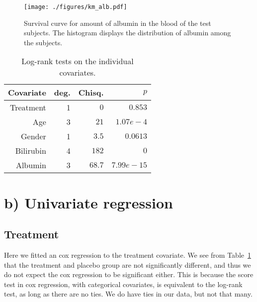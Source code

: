 \documentclass[11pt,a4paper]{article}
\begin{document}
\begin{figure}[h!tb]
    \begin{center}
        \texttt{[image: ./figures/km\_alb.pdf]}
    \end{center}
    \vspace{-0.8cm}
    \caption{Survival curve for amount of albumin in the blood of the test subjects. The histogram displays the distribution of albumin among the subjects.}
    \label{fig:alb}
\end{figure}

\begin{table}[h!tbp]
    \centering
    \caption{Log-rank tests on the individual covariates.}
    \label{tab:log_rank_indiv}
    \begin{tabular}{rrrr}
        \hline
        Covariate & deg. & Chisq. & $p$ \\ 
        \hline
        Treatment &  1 &  $0   $ & $0.853     $ \\
        Age       &  3 &  $21  $ & $1.07e-4   $ \\ 
        Gender    &  1 &  $3.5 $ & $0.0613    $ \\ 
        Bilirubin &  4 &  $182 $ & $0         $ \\ 
        Albumin   &  3 &  $68.7$ & $7.99e-15$ \\ 
        \hline
    \end{tabular}
\end{table}

\section{b) Univariate regression}

\subsection{Treatment}

Here we fitted an cox regression to the treatment covariate. We see from Table~\ref{tab:log_rank_indiv} that the treatment and placebo group are not significantly different, and thus we do not expect the cox regression to be significant either. This is because the score test in cox regression, with categorical covariates, is equivalent to the log-rank test, as long as there are no ties. We do have ties in our data, but not that many.
\end{document}
